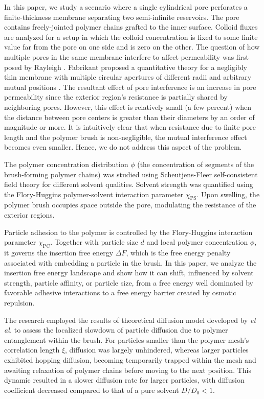 \documentclass[12pt, a4paper]{article}
\begin{document}
In this paper, we study a scenario where a single cylindrical pore perforates a finite-thickness membrane separating two semi-infinite reservoirs.
The pore contains freely-jointed polymer chains grafted to the inner surface.
Colloid fluxes are analyzed for a setup in which the colloid concentration is fixed to some finite value far from the pore on one side and is zero on the other.
The question of how multiple pores in the same membrane interfere to affect permeability was first posed by Rayleigh \cite{Strutt1878}.
Fabrikant proposed a quantitative theory for a negligibly thin membrane with multiple circular apertures of different radii and arbitrary mutual positions \cite{Fabrikant1985}.
The resultant effect of pore interference is an increase in pore permeability since the exterior region's resistance is partially shared by neighboring pores.
However, this effect is relatively small (a few percent) when the distance between pore centers is greater than their diameters by an order of magnitude or more.
It is intuitively clear that when resistance due to finite pore length and the polymer brush is non-negligible, the mutual interference effect becomes even smaller.
Hence, we do not address this aspect of the problem.

The polymer concentration distribution $\phi$ (the concentration of segments of the brush-forming polymer chains) was studied using Scheutjens-Fleer self-consistent field theory for different solvent qualities.
Solvent strength was quantified using the Flory-Huggins polymer-solvent interaction parameter $\chi_{\text{PS}}$.
Upon swelling, the polymer brush occupies space outside the pore, modulating the resistance of the exterior regions.

Particle adhesion to the polymer is controlled by the Flory-Huggins interaction parameter $\chi_{\text{PC}}$.
Together with particle size $d$ and local polymer concentration $\phi$, it governs the insertion free energy $\Delta F$, which is the free energy penalty associated with embedding a particle in the brush.
In this paper, we analyze the insertion free energy landscape and show how it can shift, influenced by solvent strength, particle affinity, or particle size, 
from a free energy well dominated by favorable adhesive interactions to a free energy barrier created by osmotic repulsion.

The research employed the results of theoretical diffusion model developed by \cite{Cai2011} \emph{et al.} to assess the localized slowdown of particle diffusion due to polymer entanglement within the brush.
For particles smaller than the polymer mesh’s correlation length $\xi$, diffusion was largely unhindered, whereas larger particles exhibited hopping diffusion, becoming temporarily trapped within the mesh and awaiting relaxation of polymer chains before moving to the next position.
This dynamic resulted in a slower diffusion rate for larger particles, with diffusion coefficient decreased compared to that of a pure solvent $D/D_0 < 1$.
\end{document}
